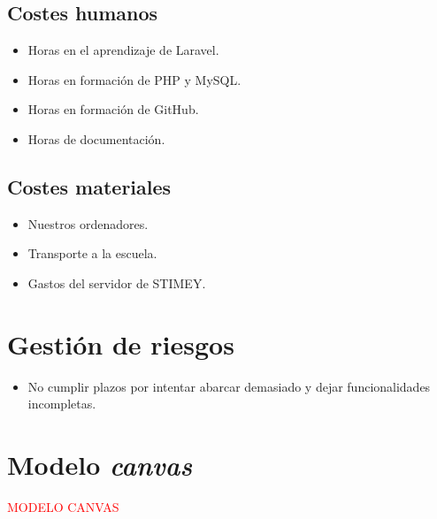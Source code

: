 \subsection{Costes humanos}
\begin{itemize}
	\item Horas en el aprendizaje de Laravel.
	\item Horas en formación de PHP y MySQL.
	\item Horas en formación de GitHub.
	\item Horas de documentación.
\end{itemize}

\subsection{Costes materiales}
\begin{itemize}
	\item Nuestros ordenadores.
	\item Transporte a la escuela.
	\item Gastos del servidor de STIMEY.
\end{itemize}

\section{Gestión de riesgos}
\begin{itemize}
	\item No cumplir plazos por intentar abarcar demasiado y dejar funcionalidades incompletas.
\end{itemize}

\section{Modelo \textit{canvas}}
\textcolor{red}{MODELO CANVAS}


